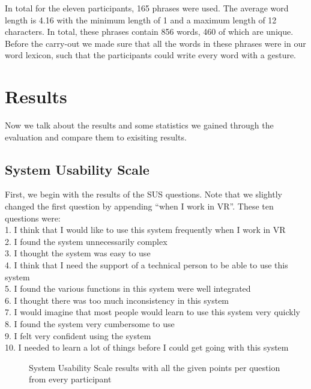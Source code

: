 In total for the eleven participants, 165 phrases were used. The average word length is 4.16 with the minimum length of 1 and a maximum length of 12 characters. In total, these phrases contain 856 words, 460 of which are unique. Before the carry-out we made sure that all the words in these phrases were in our word lexicon, such that the participants could write every word with a gesture.
\section{Results}
Now we talk about the results and some statistics we gained through the evaluation and compare them to exisiting results.\\

\subsection{System Usability Scale}
First, we begin with the results of the SUS questions. Note that we slightly changed the first question by appending ``when I work in VR''. These ten questions were:\\
1. I think that I would like to use this system frequently when I work in VR\\
2. I found the system unnecessarily complex\\
3. I thought the system was easy to use \\
4. I think that I need the support of a technical person to be able to use this system\\
5. I found the various functions in this system were well integrated\\
6. I thought there was too much inconsistency in this system\\
7. I would imagine that most people would learn to use this system very quickly\\
8. I found the system very cumbersome to use\\
9. I felt very confident using the system\\
10. I needed to learn a lot of things before I could get going with this system
\begin{figure}[H]
    \noindent
    \vspace*{-10em}
    \caption{System Usability Scale results with all the given points per question from every participant}
    \label{fig:SUS_score}
\end{figure}

